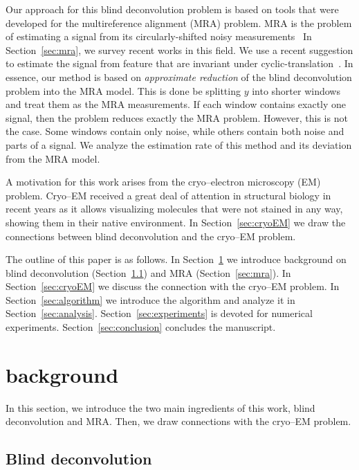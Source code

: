 \documentclass[journal]{IEEEtran}
\numberwithin{equation}{section}
\numberwithin{figure}{section}
\theoremstyle{plain}
\theoremstyle{definition}
\theoremstyle{remark}
\theoremstyle{plain}
\theoremstyle{remark}
\theoremstyle{plain}
\theoremstyle{plain}
\begin{document}
Our approach for this blind deconvolution problem is based on  tools that were developed for the multireference alignment (MRA) problem. MRA is the problem of estimating a signal from its circularly-shifted noisy measurements~\cite{bandeira2014multireference,bendory2017bispectrum} 
 In Section~\ref{sec:mra}, we survey recent works in this field. We use a recent suggestion to estimate the signal from feature that are invariant under cyclic-translation~\cite{bendory2017bispectrum}. 
 In essence, our method is based on \emph{approximate reduction} of the blind deconvolution problem into the MRA model. This is done be splitting $y$ into shorter windows and treat them as the MRA measurements. If each window contains exactly  one signal, then the problem reduces exactly the MRA problem. However, this is not the case. Some windows contain only noise, while others contain both noise and parts of a signal.  
 We analyze the estimation rate of this method and its deviation from the MRA model. 
 
 A motivation for this work arises from the cryo--electron microscopy (EM) problem. Cryo--EM received a great deal of attention in structural biology in recent years as it allows visualizing molecules that were not stained in any way, showing them in their native environment. In Section~\ref{sec:cryoEM} we draw the connections between  blind deconvolution and the cryo--EM problem.
 
 The outline of this paper is as follows. In Section~\ref{sec:literature} we introduce background  on blind deconvolution (Section~\ref{sec:blind_deconvolution}) and MRA (Section~\ref{sec:mra}).  
 In Section~\ref{sec:cryoEM} we discuss the connection with the  cryo--EM problem.  In Section~\ref{sec:algorithm} we introduce the algorithm and analyze it in Section~\ref{sec:analysis}. Section~\ref{sec:experiments} is devoted for numerical experiments. Section~\ref{sec:conclusion} concludes the manuscript.
 



\section{background} \label{sec:literature}

In this section, we introduce the two main ingredients of this work, blind deconvolution and MRA. Then, we draw connections  with the cryo--EM problem.

\subsection{Blind deconvolution} \label{sec:blind_deconvolution}
\end{document}
